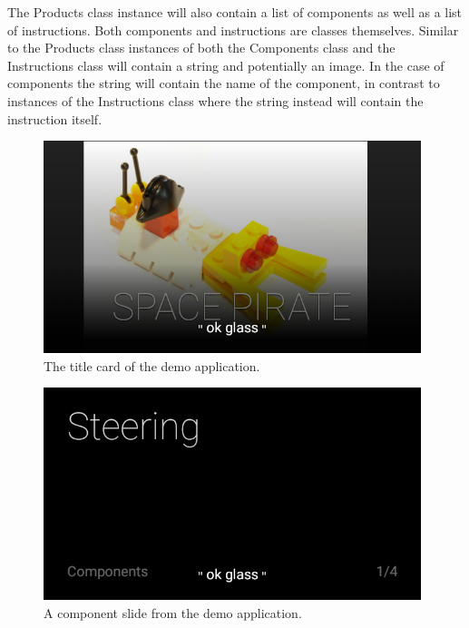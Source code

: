 The Products class instance will also contain a list of components as well as a list of instructions. Both components and instructions are classes themselves. Similar to the Products class instances of both the Components class and the Instructions class will contain a string and potentially an image. In the case of components the string will contain the name of the component, in contrast to instances of the Instructions class where the string instead will contain the instruction itself.





	\begin{figure}[H]%
		\centering
		\includegraphics[width=110mm]{images/demo/titleCard}
		\caption{The title card of the demo application.}
		\label{glassDemotitleCard}
	\end{figure}
	
	\begin{figure}[H]%
		\centering
		\includegraphics[width=110mm]{images/demo/componentText}
		\caption{A component slide from the demo application.}
		\label{glassDemoQR}
	\end{figure}
	
